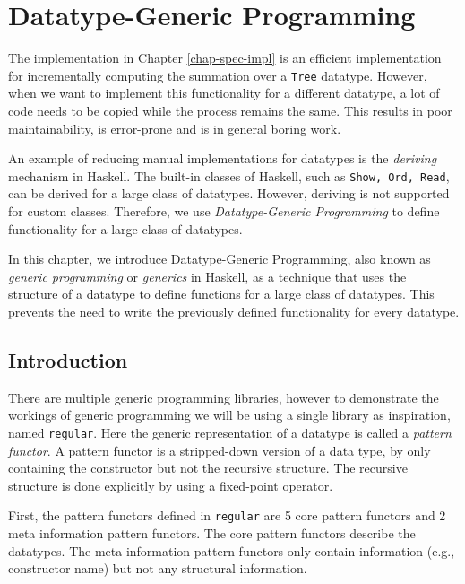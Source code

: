 \chapter{Datatype-Generic Programming}
\label{chap-dat-gen-program}


The implementation in Chapter \ref{chap-spec-impl} is an efficient implementation for incrementally computing the summation over a \texttt{Tree} datatype. However, when we want to implement this functionality for a different datatype, a lot of code needs to be copied while the process remains the same. This results in poor maintainability, is error-prone and is in general boring work.

An example of reducing manual implementations for datatypes is the \textit{deriving} mechanism in Haskell. The built-in classes of Haskell, such as \texttt{Show, Ord, Read}, can be derived for a large class of datatypes. However, deriving is not supported for custom classes. Therefore, we use \textit{Datatype-Generic Programming}\cite*{gibbons2006datatype} to define functionality for a large class of datatypes.

In this chapter, we introduce Datatype-Generic Programming, also known as \textit{generic programming} or \textit{generics} in Haskell, as a technique that uses the structure of a datatype to define functions for a large class of datatypes. This prevents the need to write the previously defined functionality for every datatype.

\section{Introduction}
There are multiple generic programming libraries, however to demonstrate the workings of generic programming we will be using a single library as inspiration, named \texttt{regular}\cite*{regular2022}. Here the generic representation of a datatype is called a \textit{pattern functor}. A pattern functor is a stripped-down version of a data type, by only containing the constructor but not the recursive structure. The recursive structure is done explicitly by using a fixed-point operator. 

First, the pattern functors defined in \texttt{regular} are 5 core pattern functors and 2 meta information pattern functors. The core pattern functors describe the datatypes. The meta information pattern functors only contain information (e.g., constructor name) but not any structural information.

